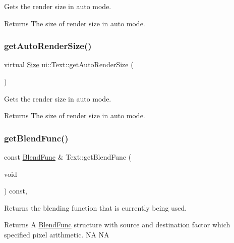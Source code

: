 Gets the render size in auto mode.

\begin{DoxyReturn}{Returns}
The size of render size in auto mode. 
\end{DoxyReturn}
\mbox{\label{classui_1_1Text_ad7710a33d6c830e9a91d256cac445b08}} 
\subsubsection{\texorpdfstring{get\+Auto\+Render\+Size()}{getAutoRenderSize()}\hspace{0.1cm}{\footnotesize\ttfamily [2/2]}}
{\footnotesize\ttfamily virtual \hyperlink{classSize}{Size} ui\+::\+Text\+::get\+Auto\+Render\+Size (\begin{DoxyParamCaption}{ }\end{DoxyParamCaption})\hspace{0.3cm}{\ttfamily [virtual]}}

Gets the render size in auto mode.

\begin{DoxyReturn}{Returns}
The size of render size in auto mode. 
\end{DoxyReturn}
\mbox{\label{classui_1_1Text_a141bd9005aaf4cf0479502e185ced570}} 
\subsubsection{\texorpdfstring{get\+Blend\+Func()}{getBlendFunc()}}
{\footnotesize\ttfamily const \hyperlink{structBlendFunc}{Blend\+Func} \& Text\+::get\+Blend\+Func (\begin{DoxyParamCaption}\item[{void}]{ }\end{DoxyParamCaption}) const\hspace{0.3cm}{\ttfamily [override]}, {\ttfamily [virtual]}}

Returns the blending function that is currently being used.

\begin{DoxyReturn}{Returns}
A \hyperlink{structBlendFunc}{Blend\+Func} structure with source and destination factor which specified pixel arithmetic.  NA  NA 
\end{DoxyReturn}
\mbox{\label{classui_1_1Text_a0e8df6544b351130890d9af3e7433582}} 
